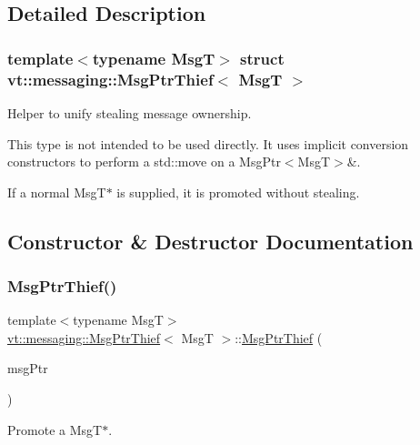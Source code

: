 \subsection{Detailed Description}
\subsubsection*{template$<$typename MsgT$>$\newline
struct vt\+::messaging\+::\+Msg\+Ptr\+Thief$<$ Msg\+T $>$}

Helper to unify \textquotesingle{}stealing\textquotesingle{} message ownership. 

This type is not intended to be used directly. It uses implicit conversion constructors to perform a \textquotesingle{}std\+::move\textquotesingle{} on a {\ttfamily Msg\+Ptr$<$\+Msg\+T$>$\&}.

If a normal {\ttfamily Msg\+T$\ast$} is supplied, it is promoted without stealing. 

\subsection{Constructor \& Destructor Documentation}
\mbox{\label{structvt_1_1messaging_1_1_msg_ptr_thief_a2055f2033d36e710bbb5247f76520d5a}} 
\subsubsection{\texorpdfstring{Msg\+Ptr\+Thief()}{MsgPtrThief()}\hspace{0.1cm}{\footnotesize\ttfamily [1/3]}}
{\footnotesize\ttfamily template$<$typename MsgT$>$ \\
\hyperlink{structvt_1_1messaging_1_1_msg_ptr_thief}{vt\+::messaging\+::\+Msg\+Ptr\+Thief}$<$ MsgT $>$\+::\hyperlink{structvt_1_1messaging_1_1_msg_ptr_thief}{Msg\+Ptr\+Thief} (\begin{DoxyParamCaption}\item[{MsgT const $\ast$}]{msg\+Ptr }\end{DoxyParamCaption})\hspace{0.3cm}{\ttfamily [inline]}}



Promote a {\ttfamily Msg\+T$\ast$}. 

